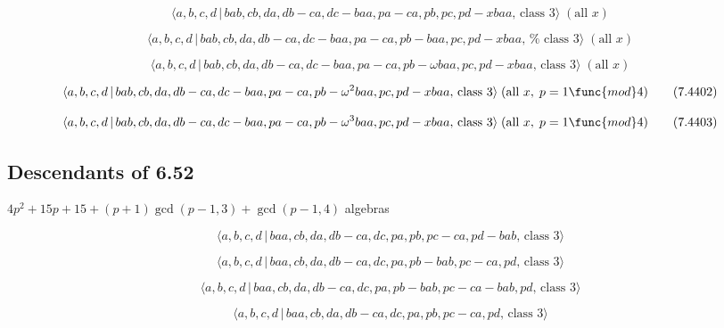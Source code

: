 \documentclass[10pt]{article}
\begin{document}
\begin{equation}
\langle a,b,c,d\,|\,bab,cb,da,db-ca,dc-baa,pa-ca,pb,pc,pd-xbaa,\,\text{class 
}3\rangle \;(\text{all }x)  \tag{7.4399}
\end{equation}

\begin{equation}
\langle a,b,c,d\,|\,bab,cb,da,db-ca,dc-baa,pa-ca,pb-baa,pc,pd-xbaa,\,\text{%
class }3\rangle \;(\text{all }x)  \tag{7.4400}
\end{equation}

\begin{equation}
\langle a,b,c,d\,|\,bab,cb,da,db-ca,dc-baa,pa-ca,pb-\omega baa,pc,pd-xbaa,\,%
\text{class }3\rangle \;(\text{all }x)  \tag{7.4401}
\end{equation}

\begin{equation}
\langle a,b,c,d\,|\,bab,cb,da,db-ca,dc-baa,pa-ca,pb-\omega
^{2}baa,pc,pd-xbaa,\,\text{class }3\rangle \;(\text{all }x,\;p=1\func{mod}4)
\tag{7.4402}
\end{equation}

\begin{equation}
\langle a,b,c,d\,|\,bab,cb,da,db-ca,dc-baa,pa-ca,pb-\omega
^{3}baa,pc,pd-xbaa,\,\text{class }3\rangle \;(\text{all }x,\;p=1\func{mod}4)
\tag{7.4403}
\end{equation}

\subsection{Descendants of 6.52}

$4p^{2}+15p+15+(p+1)\gcd (p-1,3)+\gcd (p-1,4)$ algebras

\begin{equation}
\langle a,b,c,d\,|\,baa,cb,da,db-ca,dc,pa,pb,pc-ca,pd-bab,\,\text{class }%
3\rangle  \tag{7.4404}
\end{equation}

\begin{equation}
\langle a,b,c,d\,|\,baa,cb,da,db-ca,dc,pa,pb-bab,pc-ca,pd,\,\text{class }%
3\rangle  \tag{7.4405}
\end{equation}

\begin{equation}
\langle a,b,c,d\,|\,baa,cb,da,db-ca,dc,pa,pb-bab,pc-ca-bab,pd,\,\text{class }%
3\rangle  \tag{7.4406}
\end{equation}

\begin{equation}
\langle a,b,c,d\,|\,baa,cb,da,db-ca,dc,pa,pb,pc-ca,pd,\,\text{class }3\rangle
\tag{7.4407}
\end{equation}
\end{document}
